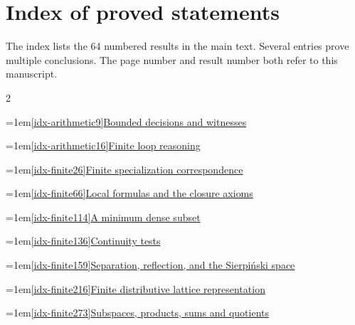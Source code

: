 \section*{Index of proved statements}
The index lists the 64 numbered results in the main text. Several entries prove multiple conclusions. The page number and result number both refer to this manuscript.
\small
\begin{multicols}{2}
\raggedcolumns\raggedright
\par\addvspace{6pt}\par\nobreak
\noindent\hangindent=1em\hyperref[idx-arithmetic9]{\ref*{idx-arithmetic9}\enspace Bounded decisions and witnesses}\nobreak\dotfill\,\pageref{idx-arithmetic9}\par
\noindent\hangindent=1em\hyperref[idx-arithmetic16]{\ref*{idx-arithmetic16}\enspace Finite loop reasoning}\nobreak\dotfill\,\pageref{idx-arithmetic16}\par
\par\addvspace{6pt}\par\nobreak
\noindent\hangindent=1em\hyperref[idx-finite26]{\ref*{idx-finite26}\enspace Finite specialization correspondence}\nobreak\dotfill\,\pageref{idx-finite26}\par
\noindent\hangindent=1em\hyperref[idx-finite66]{\ref*{idx-finite66}\enspace Local formulas and the closure axioms}\nobreak\dotfill\,\pageref{idx-finite66}\par
\noindent\hangindent=1em\hyperref[idx-finite114]{\ref*{idx-finite114}\enspace A minimum dense subset}\nobreak\dotfill\,\pageref{idx-finite114}\par
\noindent\hangindent=1em\hyperref[idx-finite136]{\ref*{idx-finite136}\enspace Continuity tests}\nobreak\dotfill\,\pageref{idx-finite136}\par
\noindent\hangindent=1em\hyperref[idx-finite159]{\ref*{idx-finite159}\enspace Separation, reflection, and the Sierpi\'nski space}\nobreak\dotfill\,\pageref{idx-finite159}\par
\noindent\hangindent=1em\hyperref[idx-finite216]{\ref*{idx-finite216}\enspace Finite distributive lattice representation}\nobreak\dotfill\,\pageref{idx-finite216}\par
\noindent\hangindent=1em\hyperref[idx-finite273]{\ref*{idx-finite273}\enspace Subspaces, products, sums and quotients}\nobreak\dotfill\,\pageref{idx-finite273}\par

\end{multicols}
